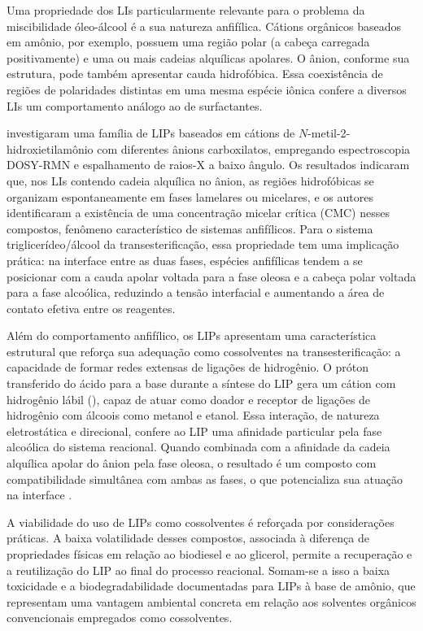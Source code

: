 Uma propriedade dos LIs particularmente relevante para o problema da miscibilidade óleo-álcool é a sua natureza anfifílica. Cátions orgânicos baseados em amônio, por exemplo, possuem uma região polar (a cabeça carregada positivamente) e uma ou mais cadeias alquílicas apolares. O ânion, conforme sua estrutura, pode também apresentar cauda hidrofóbica. Essa coexistência de regiões de polaridades distintas em uma mesma espécie iônica confere a diversos LIs um comportamento análogo ao de surfactantes\cite{alvarez2010}.

 investigaram uma família de LIPs baseados em cátions de $N$-metil-2-hidroxietilamônio com diferentes ânions carboxilatos, empregando espectroscopia DOSY-RMN e espalhamento de raios-X a baixo ângulo. Os resultados indicaram que, nos LIs contendo cadeia alquílica no ânion, as regiões hidrofóbicas se organizam espontaneamente em fases lamelares ou micelares, e os autores identificaram a existência de uma concentração micelar crítica (CMC) nesses compostos, fenômeno característico de sistemas anfifílicos. Para o sistema triglicerídeo/álcool da transesterificação, essa propriedade tem uma implicação prática: na interface entre as duas fases, espécies anfifílicas tendem a se posicionar com a cauda apolar voltada para a fase oleosa e a cabeça polar voltada para a fase alcoólica, reduzindo a tensão interfacial e aumentando a área de contato efetiva entre os reagentes\cite{trindade2019}.

Além do comportamento anfifílico, os LIPs apresentam uma característica estrutural que reforça sua adequação como cossolventes na transesterificação: a capacidade de formar redes extensas de ligações de hidrogênio. O próton transferido do ácido para a base durante a síntese do LIP gera um cátion com hidrogênio lábil (), capaz de atuar como doador e receptor de ligações de hidrogênio com álcoois como metanol e etanol\cite{trindade2019}. Essa interação, de natureza eletrostática e direcional, confere ao LIP uma afinidade particular pela fase alcoólica do sistema reacional. Quando combinada com a afinidade da cadeia alquílica apolar do ânion pela fase oleosa, o resultado é um composto com compatibilidade simultânea com ambas as fases, o que potencializa sua atuação na interface \cite{trindade2019,alvarez2010}.

A viabilidade do uso de LIPs como cossolventes é reforçada por considerações práticas. A baixa volatilidade desses compostos, associada à diferença de propriedades físicas em relação ao biodiesel e ao glicerol, permite a recuperação e a reutilização do LIP ao final do processo reacional\cite{troter2016}. Somam-se a isso a baixa toxicidade e a biodegradabilidade documentadas para LIPs à base de amônio, que representam uma vantagem ambiental concreta em relação aos solventes orgânicos convencionais empregados como cossolventes\cite{alvarez2010,trindade2019}.

